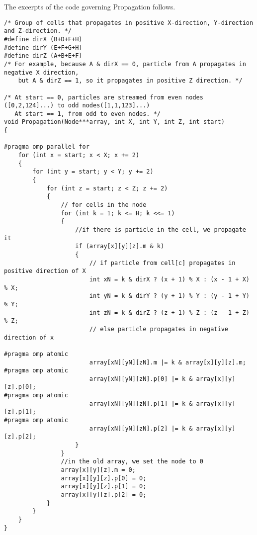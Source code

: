 The excerpts of the code governing Propagation follows. 
\begin{lstlisting}
/* Group of cells that propagates in positive X-direction, Y-direction and Z-direction. */
#define dirX (B+D+F+H)
#define dirY (E+F+G+H)
#define dirZ (A+B+E+F)
/* For example, because A & dirX == 0, particle from A propagates in negative X direction,
    but A & dirZ == 1, so it propagates in positive Z direction. */

/* At start == 0, particles are streamed from even nodes ([0,2,124]...) to odd nodes([1,1,123]...) 
   At start == 1, from odd to even nodes. */
void Propagation(Node***array, int X, int Y, int Z, int start)
{

#pragma omp parallel for
	for (int x = start; x < X; x += 2)
	{
		for (int y = start; y < Y; y += 2)
		{
			for (int z = start; z < Z; z += 2)
			{
				// for cells in the node
				for (int k = 1; k <= H; k <<= 1)
				{
					//if there is particle in the cell, we propagate it
					if (array[x][y][z].m & k)
					{
						// if particle from cell[c] propagates in positive direction of X
						int xN = k & dirX ? (x + 1) % X : (x - 1 + X) % X;
						int yN = k & dirY ? (y + 1) % Y : (y - 1 + Y) % Y;
						int zN = k & dirZ ? (z + 1) % Z : (z - 1 + Z) % Z;
						// else particle propagates in negative direction of x

#pragma omp atomic
						array[xN][yN][zN].m |= k & array[x][y][z].m;
#pragma omp atomic
						array[xN][yN][zN].p[0] |= k & array[x][y][z].p[0];
#pragma omp atomic
						array[xN][yN][zN].p[1] |= k & array[x][y][z].p[1];
#pragma omp atomic
						array[xN][yN][zN].p[2] |= k & array[x][y][z].p[2];
					}
				}
				//in the old array, we set the node to 0
				array[x][y][z].m = 0;
				array[x][y][z].p[0] = 0;
				array[x][y][z].p[1] = 0;
				array[x][y][z].p[2] = 0;
			}
		}
	}
}
\end{lstlisting}